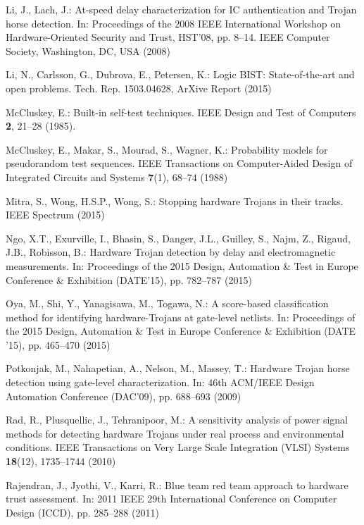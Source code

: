 \documentclass[a4paper]{llncs}
\begin{document}
\begin{thebibliography}{10}
Li, J., Lach, J.: At-speed delay characterization for {IC} authentication and
  {T}rojan horse detection.
\newblock In: Proceedings of the 2008 IEEE International Workshop on
  Hardware-Oriented Security and Trust, HST'08, pp. 8--14. IEEE Computer
  Society, Washington, DC, USA (2008)

Li, N., Carlsson, G., Dubrova, E., Petersen, K.: Logic {BIST}: State-of-the-art
  and open problems.
\newblock Tech. Rep. 1503.04628, ArXive Report (2015)

McCluskey, E.: Built-in self-test techniques.
\newblock IEEE Design and Test of Computers \textbf{2}, 21--28 (1985).
\newblock {}

McCluskey, E., Makar, S., Mourad, S., Wagner, K.: Probability models for
  pseudorandom test sequences.
\newblock IEEE Transactions on Computer-Aided Design of Integrated Circuits and
  Systems \textbf{7}(1), 68--74 (1988)

Mitra, S., Wong, H.S.P., Wong, S.: Stopping hardware {T}rojans in their tracks.
\newblock IEEE Spectrum  (2015)

Ngo, X.T., Exurville, I., Bhasin, S., Danger, J.L., Guilley, S., Najm, Z.,
  Rigaud, J.B., Robisson, B.: Hardware {T}rojan detection by delay and
  electromagnetic measurements.
\newblock In: Proceedings of the 2015 Design, Automation \& Test in Europe
  Conference \& Exhibition (DATE'15), pp. 782--787 (2015)

Oya, M., Shi, Y., Yanagisawa, M., Togawa, N.: A score-based classification
  method for identifying hardware-{T}rojans at gate-level netlists.
\newblock In: Proceedings of the 2015 Design, Automation \& Test in Europe
  Conference \& Exhibition (DATE '15), pp. 465--470 (2015)

Potkonjak, M., Nahapetian, A., Nelson, M., Massey, T.: Hardware {T}rojan horse
  detection using gate-level characterization.
\newblock In: 46th ACM/IEEE Design Automation Conference (DAC'09), pp. 688--693
  (2009)

Rad, R., Plusquellic, J., Tehranipoor, M.: A sensitivity analysis of power
  signal methods for detecting hardware {T}rojans under real process and
  environmental conditions.
\newblock IEEE Transactions on Very Large Scale Integration (VLSI) Systems
  \textbf{18}(12), 1735--1744 (2010)

Rajendran, J., Jyothi, V., Karri, R.: Blue team red team approach to hardware
  trust assessment.
\newblock In: 2011 IEEE 29th International Conference on Computer Design
  (ICCD), pp. 285--288 (2011)


\end{thebibliography}
\end{document}
